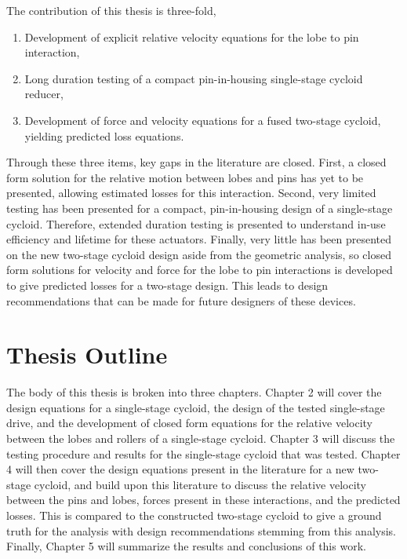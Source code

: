 The contribution of this thesis is three-fold,
\begin{enumerate}
	\item Development of explicit relative velocity equations for the lobe to pin interaction,
	\item Long duration testing of a compact pin-in-housing single-stage cycloid reducer,
	\item Development of force and velocity equations for a fused two-stage cycloid, yielding predicted loss equations. 
\end{enumerate}
Through these three items, key gaps in the literature are closed. First, a closed form solution for the relative motion between lobes and pins has yet to be presented, allowing estimated losses for this interaction. Second, very limited testing has been presented for a compact, pin-in-housing design of a single-stage cycloid. Therefore, extended duration testing is presented to understand in-use efficiency and lifetime for these actuators. Finally, very little has been presented on the new two-stage cycloid design aside from the geometric analysis, so closed form solutions for velocity and force for the lobe to pin interactions is developed to give predicted losses for a two-stage design. This leads to design recommendations that can be made for future designers of these devices. 

\section{Thesis Outline} \label{intro:outline}
The body of this thesis is broken into three chapters. Chapter 2 will cover the design equations for a single-stage cycloid, the design of the tested single-stage drive, and the development of closed form equations for the relative velocity between the lobes and rollers of a single-stage cycloid. Chapter 3 will discuss the testing procedure and results for the single-stage cycloid that was tested. Chapter 4 will then cover the design equations present in the literature for a new two-stage cycloid, and build upon this literature to discuss the relative velocity between the pins and lobes, forces present in these interactions, and the predicted losses. This is compared to the constructed two-stage cycloid to give a ground truth for the analysis with design recommendations stemming from this analysis. Finally, Chapter 5 will summarize the results and conclusions of this work. 
